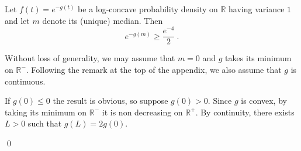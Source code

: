 \documentclass[10pt,a4paper]{amsart}
\newcommand{\R}{\mathbb{R}}
\newenvironment{proof}{\par\noindent{\bf Proof:}}{\qed \par\medskip\noindent}
\begin{document}
\begin{lemma}
\label{density lower bound}
Let $f(t) = e^{-g(t)}$ be a log-concave probability density on $\R$
having variance $1$ and let $m$ denote its (unique) median. Then 
$$ e^{-g(m)}\geq \frac{e^{-4}}{2}~.$$
\end{lemma}

\begin{proof}
Without loss of generality, we may assume that $m=0$ and $g$ takes
its minimum on $\R^-$. Following the remark at the top of the appendix, we also assume that $g$ is continuous.

If $g(0)\leq 0$ the result is obvious, so suppose $g(0)>0$.
Since $g$ is convex, by taking its minimum on $\R^-$ it is non
decreasing on $\R^+$.
By continuity, there exists $L>0$ such that
$g(L)=2g(0)$.


\end{proof}
\end{document}
